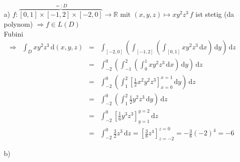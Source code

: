 \begin{itemize}
    \item[a)] $f\colon \overbrace{[0,1]\times [-1,2] \times [-2,0]}^{=:D} \to \mathbb{R} \text{ mit } (x,y,z) \mapsto xy^2 z^3 \, f$ ist stetig (da polynom) $\Rightarrow f\in L(D)$\\
    Fubini \begin{align*}
        \Rightarrow & \int_D xy^2 z^3 \, \text{d}(x,y,z) &=& \int_{[-2,0]}\left(\int_{[-1,2]}\left(\int_{[0,1]} xy^2 z^3 \, \text{d}x \right)\, \text{d}y\right)\, \text{d}z\\
        & &=& \int_{-2}^0 \left(\int_{-1}^2 \left(\int_0^1 x y^2 z^3 \, \text{d}x\right)\, \text{d}y\right)\, \text{d}z\\
        & &=& \int_{-2}^0 \left(\int_1^2 [\frac{1}{2}x^2 y^2 z^3]_{x=0}^{x=1} \, \text{d}y\right)\, \text{d}z\\
        & &=& \int_{-2}^0 \left(\int_1^2 \frac{1}{2}y^2 z^3 \, \text{d}y\right)\, \text{d}z\\
        & &=& \int_{-2}^0 [\frac{1}{6} y^3 z^3]_{y=1}^{y=2} \, \text{d}z\\
        & &=& \int_{-2}^0 \frac{3}{2} z^3 \, \text{d}z = [\frac{3}{8} z^4]_{z=-2}^{z=0} = -\frac{3}{8}(-2)^4 = -6
    \end{align*} 
    \item[b)]  
\end{itemize}